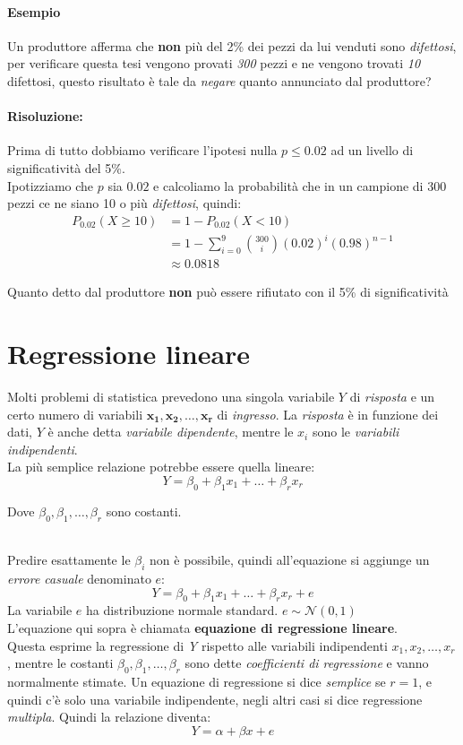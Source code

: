 \documentclass[]{article}
\begin{document}
    \paragraph{Esempio} Un produttore afferma che \textbf{non} più del 2\% dei pezzi da lui venduti sono \textit{difettosi}, per verificare questa tesi vengono provati \textit{300} pezzi e ne vengono trovati \textit{10} difettosi, questo risultato è tale da \textit{negare} quanto annunciato dal produttore?
    \paragraph{Risoluzione:} Prima di tutto dobbiamo verificare l'ipotesi nulla $p \leq 0.02$ ad un livello di significatività del 5\%. \\ 
    Ipotizziamo che $p$ sia $0.02$ e calcoliamo la probabilità che in un campione di 300 pezzi ce ne siano 10 o più \textit{difettosi}, quindi:
    \begin{equation*}
        \begin{split}
            P_{0.02}(X \geq 10) &= 1 - P_{0.02}(X < 10) \\
            &= 1 - \sum_{i=0}^{9} \binom{300}{i} (0.02)^i (0.98)^{n-1} \\
            &\approx \boldsymbol{0.0818}
        \end{split}
    \end{equation*}
    \centerline{Quanto detto dal produttore \textbf{non} può essere rifiutato con il 5\% di significatività}
    \newpage
    \section{Regressione lineare}
    Molti problemi di statistica prevedono una singola variabile $Y$ di \emph{risposta} e un certo numero di variabili $\boldsymbol{x_1, x_2, \ldots, x_r}$ di \emph{ingresso}. La \emph{risposta} è in funzione dei dati, $Y$ è anche detta \emph{variabile dipendente}, mentre le $x_i$ sono le \emph{variabili indipendenti}.\\
    La più semplice relazione potrebbe essere quella lineare:
    \[ Y = \beta_0 + \beta_1x_1 + \ldots  + \beta_rx_r \]
    \centerline{Dove $\beta_0, \beta_1, \ldots, \beta_r$ sono costanti.} \\[2ex]
    Predire esattamente le $\beta_i$ non è possibile, quindi all'equazione si aggiunge un \emph{errore casuale} denominato $e$:
    \[ Y = \beta_0 + \beta_1x_1 + \ldots + \beta_rx_r + e \]
    La variabile $e$ ha distribuzione normale standard. $e \sim \mathcal N(0,1)$ \\
    L'equazione qui sopra è chiamata \textbf{equazione di regressione lineare}. \\
    Questa esprime la regressione di \emph{Y} rispetto alle variabili indipendenti $x_1, x_2, \ldots, x_r$, mentre le costanti $\beta_0, \beta_1, \ldots, \beta_r$ sono dette \emph{coefficienti di regressione} e vanno normalmente stimate.
    Un equazione di regressione si dice \emph{semplice} se $r = 1$, e quindi c'è solo una variabile indipendente, negli altri casi si dice regressione \emph{multipla}.
    Quindi la relazione diventa:
    \[ Y = \alpha + \beta x + e \]
\end{document}
